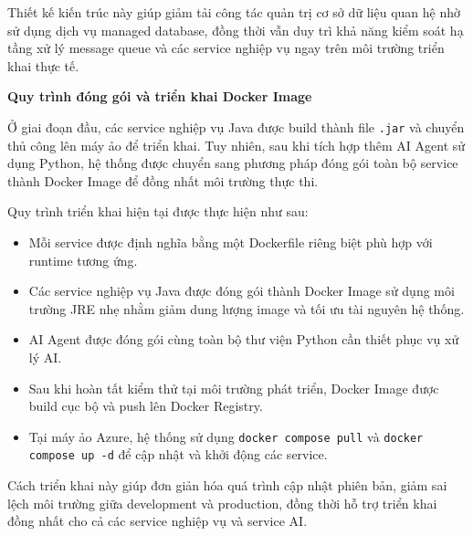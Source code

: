 Thiết kế kiến trúc này giúp giảm tải công tác quản trị cơ sở dữ liệu quan hệ nhờ sử dụng dịch vụ managed database, đồng thời vẫn duy trì khả năng kiểm soát hạ tầng xử lý message queue và các service nghiệp vụ ngay trên môi trường triển khai thực tế.

\textbf{Quy trình đóng gói và triển khai Docker Image}

Ở giai đoạn đầu, các service nghiệp vụ Java được build thành file \texttt{.jar} và chuyển thủ công lên máy ảo để triển khai. Tuy nhiên, sau khi tích hợp thêm AI Agent sử dụng Python, hệ thống được chuyển sang phương pháp đóng gói toàn bộ service thành Docker Image để đồng nhất môi trường thực thi.

Quy trình triển khai hiện tại được thực hiện như sau:

\begin{itemize}
    \item Mỗi service được định nghĩa bằng một Dockerfile riêng biệt phù hợp với runtime tương ứng.
    
    \item Các service nghiệp vụ Java được đóng gói thành Docker Image sử dụng môi trường JRE nhẹ nhằm giảm dung lượng image và tối ưu tài nguyên hệ thống.
    
    \item AI Agent được đóng gói cùng toàn bộ thư viện Python cần thiết phục vụ xử lý AI.
    
    \item Sau khi hoàn tất kiểm thử tại môi trường phát triển, Docker Image được build cục bộ và push lên Docker Registry.
    
    \item Tại máy ảo Azure, hệ thống sử dụng \texttt{docker compose pull} và \texttt{docker compose up -d} để cập nhật và khởi động các service.
\end{itemize}

Cách triển khai này giúp đơn giản hóa quá trình cập nhật phiên bản, giảm sai lệch môi trường giữa development và production, đồng thời hỗ trợ triển khai đồng nhất cho cả các service nghiệp vụ và service AI.

